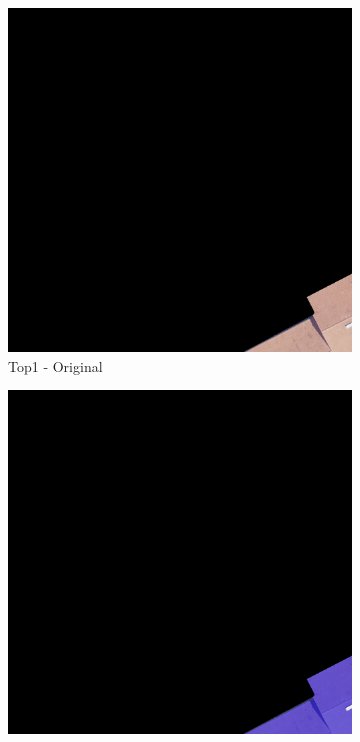 \begin{figure}[H]
\centering
\begin{subfigure}{0.32\textwidth}
    \includegraphics[width=\textwidth]{02-main//figures/ch4/kfold_ensembles/unetplusplus_tu-efficientnetv2_rw_s.ra2_in1k/best_cases/best_5_iou0.989_24931113_tile_13_18_a66e08_original.png}
    \caption{Top1 - Original}
\end{subfigure}
\hfill
\begin{subfigure}{0.32\textwidth}
    \includegraphics[width=\textwidth]{02-main//figures/ch4/kfold_ensembles/unetplusplus_tu-efficientnetv2_rw_s.ra2_in1k/best_cases/best_5_iou0.989_24931113_tile_13_18_a66e08_overlay_gt.png}

\end{subfigure}
\end{figure}
